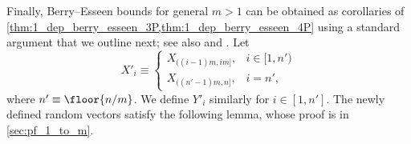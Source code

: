 \documentclass[aos]{imsart}
\begin{document}

Finally, Berry--Esseen bounds for general $m>1$ can be obtained as corollaries of \cref{thm:1_dep_berry_esseen_3P,thm:1_dep_berry_esseen_4P} using a standard argument that we outline next; see also \citet[Theorem 2]{shergin1980convergence} and \citet[Theorem 2.6]{chen2004normal}.
Let 
\begin{equation} \label{eq:block_setting}
    X'_i \equiv \begin{cases}
        X_{((i-1)m, im]}, & i \in [1,n') \\
        X_{((n'-1)m, n]}, & i = n',
    \end{cases}
\end{equation}
where $n' \equiv \floor{{n}/{m}}$.
We define $Y'_i$ similarly for $i \in [1,n']$. 
The newly defined random vectors satisfy the following lemma, whose proof is in \cref{sec:pf_1_to_m}.
\end{document}
